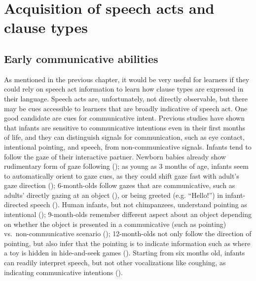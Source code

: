 \section{Acquisition of speech acts and clause types}
\label{sec:bg:acq}
\subsection{Early communicative abilities}
\label{sec:bg:acq:pre}
As mentioned in the previous chapter, it would be very useful for learners if they could rely on speech act information to learn how clause types are expressed in their language. Speech acts are, unfortunately, not directly observable, but there may be cues accessible to learners that are broadly indicative of speech act. One good candidate are cues for communicative intent.
Previous studies have shown that infants are sensitive to %
communicative intentions even in their first months of life, and they can distinguish signals for communication, such as eye contact, intentional pointing, and speech, from non-communicative signals. Infants tend to follow the gaze of their interactive partner. Newborn babies already show rudimentary form of gaze following (\cite{farroni2004gaze}); as young as 3 months of age, infants seem to automatically orient to gaze cues, as they could shift gaze fast with adult’s gaze direction (\cite{hood1998gaze}); 6-month-olds follow gazes that are communicative, such as adults' directly gazing at an object (\cite{gredeback2008gaze}), or being greeted (e.g. ``Hello!'') in infant-directed speech (\cite{senju2008gaze}). Human infants, but not chimpanzees, understand pointing as intentional (\cite{pika2006point, povinelli1997point,morissette1995joint}); 9-month-olds remember different aspect about an object depending on whether the object is presented in a communicative (such as pointing) vs.\ non-communicative scenario (\cite{yoon2008intent}); 12-month-olds not only follow the direction of pointing, but also infer that the pointing is to indicate information such as where a toy is hidden in hide-and-seek games (\cite{behne2005hide,behne2012point}). Starting from six months old, infants can readily interpret speech, but not other vocalizations like coughing, as indicating communicative intentions (\cite{vouloumanos2014intent}).

